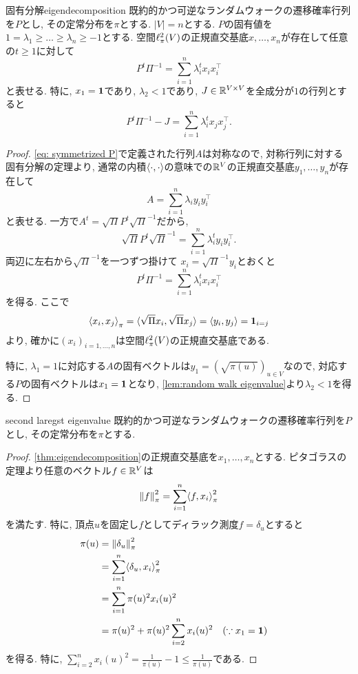 %
\begin{theorem}{固有分解}{eigendecomposition}
    既約的かつ可逆なランダムウォークの遷移確率行列を$P$とし, その定常分布を$\pi$とする.
    $|V|=n$とする.
    $P$の固有値を$1=\lambda_1\ge \dots \ge \lambda_n \ge -1$とする.
    空間$\ell^2_\pi(V)$の正規直交基底$x,\dots,x_n$が存在して任意の$t\ge 1$に対して
    \[ P^t\Pi^{-1} = \sum_{i=1}^n \lambda_i^t x_i x_i^{\top}  \]
    と表せる.
    特に, $x_1 = \mathbf{1}$であり, $\lambda_2 < 1$であり,
    $J \in \mathbb{R}^{V \times V}$を全成分が$1$の行列とすると
    \[ P^t \Pi^{-1} - J =  \sum_{i=1}^n \lambda_i^t x_j x_j^\top. \]
\end{theorem}
\begin{proof}
    \cref{eq: symmetrized P}で定義された行列$A$は対称なので,
    対称行列に対する固有分解の定理より, 
    通常の内積$\langle\cdot, \cdot\rangle$の意味での$\mathbb{R}^V$の正規直交基底$y_1,\dots,y_n$が存在して
    \[
        A = \sum_{i=1}^n \lambda_i y_i y_i^\top
    \]
    と表せる.
    一方で$A^t = \sqrt{\Pi} P^t \sqrt{\Pi}^{-1}$だから,
    \[
        \sqrt{\Pi} P^t \sqrt{\Pi}^{-1} = \sum_{i=1}^n \lambda_i^t y_i y_i^\top.
    \]
    両辺に左右から$\sqrt{\Pi}^{-1}$を一つずつ掛けて
    $x_i = \sqrt{\Pi}^{-1}y_i$とおくと
    \[
        P^t \Pi^{-1} = \sum_{i=1}^n \lambda_i^t x_i x_i^\top
    \]
    を得る.
    ここで
    \[
        \left\langle x_i,x_j\right\rangle_{\pi} = \langle\sqrt{\Pi}x_i,\sqrt{\Pi}x_j\rangle = \langle y_i,y_j\rangle = \mathbf{1}_{i=j}
    \]
    より, 確かに$(x_i)_{i=1,\dots,n}$は空間$\ell^2_\pi(V)$の正規直交基底である.

    特に, $\lambda_1=1$に対応する$A$の固有ベクトルは$y_1 = (\sqrt{\pi(u)})_{u \in V}$なので,
    対応する$P$の固有ベクトルは$x_1 = \mathbf{1}$となり,
    \cref{lem:random walk eigenvalue}より$\lambda_2<1$を得る.
\end{proof}
%
\begin{lemma}{}{second laregst eigenvalue}
    既約的かつ可逆なランダムウォークの遷移確率行列を$P$とし, その定常分布を$\pi$とする.
        
\end{lemma}
\begin{proof}
    \cref{thm:eigendecomposition}の正規直交基底を$x_1,\dots,x_n$とする.
    ピタゴラスの定理より任意のベクトル$f \in \mathbb{R}^V$は
    \[ \pinorm{f}^2 = \sum_{i=1}^n \piprod{f,x_i}^2 \]
    を満たす.
    特に, 頂点$u$を固定し$f$としてディラック測度$f=\delta_u$とすると
    \begin{align*}
        \pi(u) &= \pinorm{\delta_u}^2 \\
        &= \sum_{i=1}^n \piprod{\delta_u,x_i}^2 \\
        &= \sum_{i=1}^n \pi(u)^2x_i(u)^2 \\
        &= \pi(u)^2 + \pi(u)^2\sum_{i=2}^n x_i(u)^2 & & \text{($\because x_1=\allone$)}
    \end{align*}
    を得る.
    特に, $\sum_{i=2}^n x_i(u)^2 = \frac{1}{\pi(u)} - 1 \le \frac{1}{\pi(u)}$である.
\end{proof}


